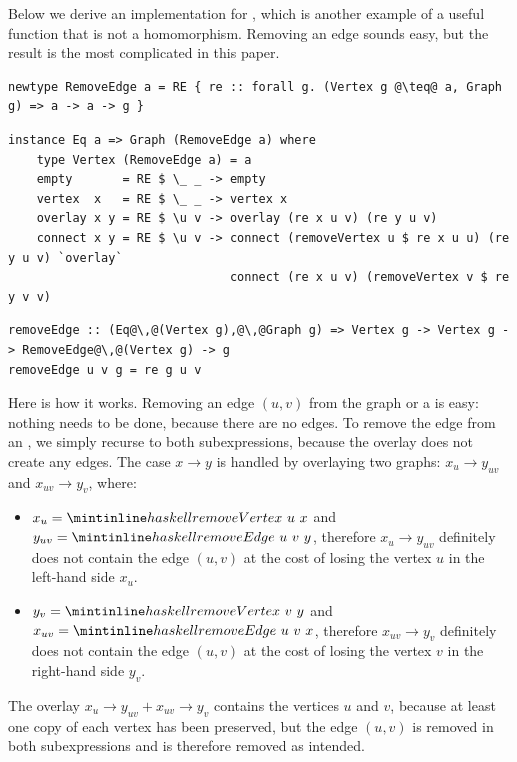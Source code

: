 Below we derive an implementation for , which is another
example of a useful function that is not a homomorphism. Removing an edge sounds
easy, but the result is the most complicated  in this paper.

\begin{verbatim}
newtype RemoveEdge a = RE { re :: forall g. (Vertex g @\teq@ a, Graph g) => a -> a -> g }
\end{verbatim}
\vspace{1mm}
\begin{verbatim}
instance Eq a => Graph (RemoveEdge a) where
    type Vertex (RemoveEdge a) = a
    empty       = RE $ \_ _ -> empty
    vertex  x   = RE $ \_ _ -> vertex x
    overlay x y = RE $ \u v -> overlay (re x u v) (re y u v)
    connect x y = RE $ \u v -> connect (removeVertex u $ re x u u) (re y u v) `overlay`
                               connect (re x u v) (removeVertex v $ re y v v)
\end{verbatim}
\vspace{0mm}
\begin{verbatim}
removeEdge :: (Eq@\,@(Vertex g),@\,@Graph g) => Vertex g -> Vertex g -> RemoveEdge@\,@(Vertex g) -> g
removeEdge u v g = re g u v
\end{verbatim}

\noindent
Here is how it works. Removing an edge $(u,v)$ from the  graph
or a  is easy:
nothing needs to be done, because there are no edges. To remove the edge from an
, we simply recurse to both subexpressions, because the overlay does not create
any edges. The  case $x \rightarrow y$ is handled by overlaying two graphs:
$x_u \rightarrow y_{uv}$ and $x_{uv} \rightarrow y_v$, where:

\begin{itemize}
    \item $x_u = \hs{removeVertex}~u~x$ and $y_{uv} = \hs{removeEdge}~u~v~y$,
    therefore $x_u \rightarrow y_{uv}$ definitely does not contain the edge $(u,v)$
    at the cost of losing the vertex $u$ in the left-hand side $x_u$.
    \item $y_v = \hs{removeVertex}~v~y$ and $x_{uv} = \hs{removeEdge}~u~v~x$,
    therefore $x_{uv} \rightarrow y_v$ definitely does not contain the edge $(u,v)$
    at the cost of losing the vertex $v$ in the right-hand side $y_v$.
\end{itemize}
\noindent
The overlay $x_u \rightarrow y_{uv} + x_{uv} \rightarrow y_v$ contains the
vertices $u$ and $v$, because at least one copy of each vertex has been preserved,
but the edge $(u,v)$ is removed in both subexpressions and is therefore removed as
intended.

